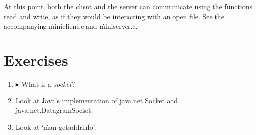 At this point, both the client and the server can communicate
  using the functions \.{read} and \.{write},
  as if they would be interacting with an open file.
See the accompanying \.{miniclient.c} and \.{miniserver.c}.


\section{Exercises}

\begin{enumerate}
\item
  $\blacktriangleright$
  What is a \emph{socket}?
\item
  Look at Java's implementation of
    \.{java.net.Socket} and \.{java.net.DatagramSocket}.
\item
  Look at `\.{man getaddrinfo}'.
\end{enumerate}


